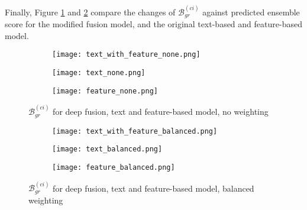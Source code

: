 Finally, Figure \ref{fig:grad_fusion_none} and \ref{fig:grad_fusion_balanced} compare the changes of $\mathcal{B}^{(ci)}_{gr}$ against predicted ensemble score for the modified fusion model, and the original text-based and feature-based model.

\begin{figure}[H]
    \centering
    \begin{minipage}{0.3\textwidth}
        \begin{figure}[H]
            \centering
            \texttt{[image: text\_with\_feature\_none.png]}
        \end{figure}
    \end{minipage}
    \begin{minipage}{0.3\textwidth}
        \begin{figure}[H]
            \centering
            \texttt{[image: text\_none.png]}
        \end{figure}
    \end{minipage}
    \begin{minipage}{0.3\textwidth}
        \begin{figure}[H]
            \centering
            \texttt{[image: feature\_none.png]}
        \end{figure}
    \end{minipage}
    \caption{$\mathcal{B}_{gr}^{(ci)}$ for deep fusion, text and feature-based model, no weighting}
    \label{fig:grad_fusion_none}
\end{figure}

\begin{figure}[H]
    \centering
    \begin{minipage}{0.3\textwidth}
        \begin{figure}[H]
            \centering
            \texttt{[image: text\_with\_feature\_balanced.png]}
        \end{figure}
    \end{minipage}
    \begin{minipage}{0.3\textwidth}
        \begin{figure}[H]
            \centering
            \texttt{[image: text\_balanced.png]}
        \end{figure}
    \end{minipage}
    \begin{minipage}{0.3\textwidth}
        \begin{figure}[H]
            \centering
            \texttt{[image: feature\_balanced.png]}
        \end{figure}
    \end{minipage}
    \caption{$\mathcal{B}_{gr}^{(ci)}$ for deep fusion, text and feature-based model, balanced weighting}
    \label{fig:grad_fusion_balanced}
\end{figure}

